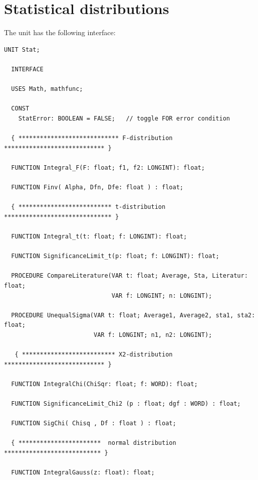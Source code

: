 \chapter{Statistical distributions}
\begin{refsection}


The unit has the following interface:
\begin{lstlisting}[caption=Interface of \texttt{Stat}]
  UNIT Stat;

  INTERFACE

  USES Math, mathfunc;

  CONST
    StatError: BOOLEAN = FALSE;   // toggle FOR error condition

  { **************************** F-distribution **************************** }

  FUNCTION Integral_F(F: float; f1, f2: LONGINT): float;

  FUNCTION Finv( Alpha, Dfn, Dfe: float ) : float;

  { ************************** t-distribution ****************************** }

  FUNCTION Integral_t(t: float; f: LONGINT): float;

  FUNCTION SignificanceLimit_t(p: float; f: LONGINT): float;

  PROCEDURE CompareLiterature(VAR t: float; Average, Sta, Literatur: float;
                              VAR f: LONGINT; n: LONGINT);

  PROCEDURE UnequalSigma(VAR t: float; Average1, Average2, sta1, sta2: float;
                         VAR f: LONGINT; n1, n2: LONGINT);

   { ************************** X2-distribution **************************** }

  FUNCTION IntegralChi(ChiSqr: float; f: WORD): float;

  FUNCTION SignificanceLimit_Chi2 (p : float; dgf : WORD) : float;

  FUNCTION SigChi( Chisq , Df : float ) : float;

  { ***********************  normal distribution *************************** }

  FUNCTION IntegralGauss(z: float): float;


\end{lstlisting}
\end{refsection}
